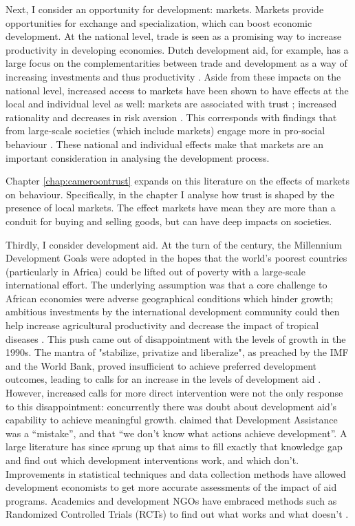 Next, I consider an opportunity for development: markets. Markets provide opportunities for exchange and specialization, which can boost economic development. At the national level, trade is seen as a promising way to increase productivity in developing economies. Dutch development aid, for example, has a large focus on the complementarities between trade and development as a way of increasing investments and thus productivity \citep[see e.g.][]{Zoomers2014}. Aside from these impacts on the national level, increased access to markets have been shown to have effects at the local and individual level as well: markets are associated with trust \citep{Tu2010,Fischer2008}; increased rationality \citep{List2008,Cecchi2013,Braga2009} and decreases in risk aversion \citep{Melesse2015}. This corresponds with findings that from large-scale societies (which include markets) engage more in pro-social behaviour \cite{Henrich2005,Henrich2010}. These national and individual effects make that markets are an important consideration in analysing the development process. 

Chapter \ref{chap:cameroontrust} expands on this literature on the effects of markets on behaviour. Specifically, in the chapter I analyse how trust is shaped by the presence of local markets. The effect markets have mean they are more than a conduit for buying and selling goods, but can have deep impacts on societies.

Thirdly, I consider development aid. At the turn of the century, the Millennium Development Goals were adopted in the hopes that the world's poorest countries (particularly in Africa) could be lifted out of poverty with a large-scale international effort. The underlying assumption was that a core challenge to African economies were adverse geographical conditions which hinder growth; ambitious investments by the international development community could then help increase agricultural productivity and decrease the impact of tropical diseases \citep{Sachs2005}. This push came out of disappointment with the levels of growth in the 1990s. The mantra of "stabilize, privatize and liberalize", as preached by the IMF and the World Bank, proved insufficient to achieve preferred development outcomes, leading to calls  for an increase in the levels of development aid \citep{Rodrik2006a}. However, increased calls for more direct intervention were not the only response to this disappointment: concurrently there was doubt about development aid's capability to achieve meaningful growth. \citet{Easterly2007} claimed that Development Assistance was a ``mistake'', and that ``we don't know what actions achieve development''. A large literature has since sprung up that aims to fill exactly that knowledge gap and find out which development interventions work, and which don't. Improvements in statistical techniques and data collection methods have allowed development economists to get more accurate assessments of the impact of aid programs. Academics and development NGOs have embraced methods such as Randomized Controlled Trials (RCTs) to find out what works and what doesn't \citep[see e.g.][]{Bannerjee2011}.  


